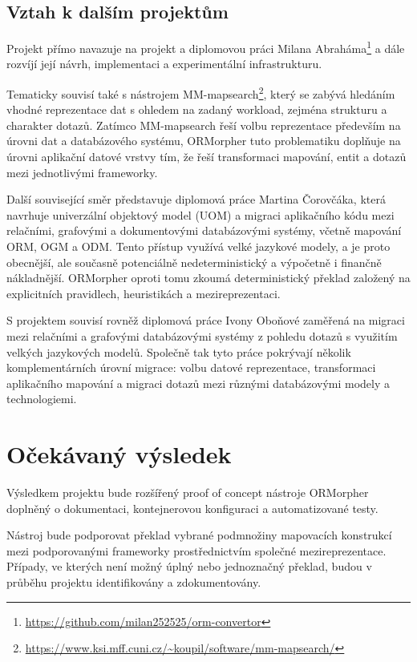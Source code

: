 \documentclass{article}
\begin{document}
\subsection{Vztah k dalším projektům}

Projekt přímo navazuje na projekt a diplomovou práci Milana Abraháma\footnote{\url{https://github.com/milan252525/orm-convertor}} a dále rozvíjí její návrh, implementaci a experimentální infrastrukturu.

Tematicky souvisí také s nástrojem MM-mapsearch\footnote{\url{https://www.ksi.mff.cuni.cz/~koupil/software/mm-mapsearch/}}, který se zabývá hledáním vhodné reprezentace dat s ohledem na zadaný workload, zejména strukturu a charakter dotazů. Zatímco MM-mapsearch řeší volbu reprezentace především na úrovni dat a databázového systému, ORMorpher tuto problematiku doplňuje na úrovni aplikační datové vrstvy tím, že řeší transformaci mapování, entit a dotazů mezi jednotlivými frameworky.

Další související směr představuje diplomová práce Martina Čorovčáka, která navrhuje univerzální objektový model (UOM) a migraci aplikačního kódu mezi relačními, grafovými a dokumentovými databázovými systémy, včetně mapování ORM, OGM a ODM. Tento přístup využívá velké jazykové modely, a je proto obecnější, ale současně potenciálně nedeterministický a výpočetně i finančně nákladnější. ORMorpher oproti tomu zkoumá deterministický překlad založený na explicitních pravidlech, heuristikách a mezireprezentaci.

S projektem souvisí rovněž diplomová práce Ivony Oboňové zaměřená na migraci mezi relačními a grafovými databázovými systémy z pohledu dotazů s využitím velkých jazykových modelů. Společně tak tyto práce pokrývají několik komplementárních úrovní migrace: volbu datové reprezentace, transformaci aplikačního mapování a migraci dotazů mezi různými databázovými modely a technologiemi.

\section{Očekávaný výsledek}

Výsledkem projektu bude rozšířený proof of concept nástroje ORMorpher doplněný o dokumentaci, kontejnerovou konfiguraci a automatizované testy.

Nástroj bude podporovat překlad vybrané podmnožiny mapovacích konstrukcí mezi podporovanými frameworky prostřednictvím společné mezireprezentace. Případy, ve kterých není možný úplný nebo jednoznačný překlad, budou v průběhu projektu identifikovány a zdokumentovány.
\end{document}
